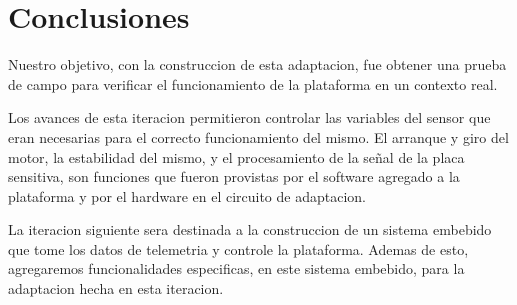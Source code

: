 

\section{Conclusiones} %
\label{it6:sec:conclusiones}

Nuestro objetivo, con la construccion de esta adaptacion, fue obtener una prueba de campo para verificar el funcionamiento de la plataforma en un contexto real.

Los avances de esta iteracion permitieron controlar las variables del sensor que eran necesarias para el correcto funcionamiento del mismo. El arranque y giro del motor, la estabilidad del mismo, y el procesamiento de la señal de la placa sensitiva, son funciones que fueron provistas por el software agregado a la plataforma y por el hardware en el circuito de adaptacion. 

La iteracion siguiente sera destinada a la construccion de un sistema embebido que tome los datos de telemetria y controle la plataforma. Ademas de esto, agregaremos funcionalidades especificas, en este sistema embebido, para la adaptacion hecha en esta iteracion. 


